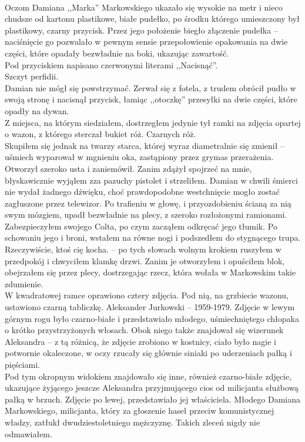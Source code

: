 \documentclass[../MAIN.tex]{subfiles}
\begin{document}
\\
Oczom Damiana ,,Marka'' Markowskiego ukazało się wysokie na metr i nieco chudsze od kartonu plastikowe, białe pudełko, po środku którego umieszczony był plastikowy, czarny przycisk. Przez jego położenie biegło złączenie pudełka -- naciśnięcie go pozwalało w pewnym sensie przepołowienie opakowania na dwie części, które opadały bezwładnie na boki, ukazując zawartość.\\
Pod przyciskiem napisano czerwonymi literami ,,Nacisnąć''.\\
Szczyt perfidii.\\
Damian nie mógł się powstrzymać. Zerwał się z fotela, z trudem obrócił pudło w swoją stronę i nacisnął przycisk, łamiąc ,,otoczkę'' przesyłki na dwie części, które opadły na dywan.\\
Z miejsca, na którym siedziałem, dostrzegłem jedynie tył ramki na zdjęcia opartej o wazon, z którego sterczał bukiet róż. Czarnych róż.\\
Skupiłem się jednak na twarzy starca, której wyraz diametralnie się zmienił -- uśmiech wyparował w mgnieniu oka, zastąpiony przez grymas przerażenia. Otworzył szeroko usta i zaniemówił. Zanim zdążył spojrzeć na mnie, błyskawicznie wyjąłem zza pazuchy pistolet i strzeliłem. Damian w chwili śmierci nie wydał żadnego dźwięku, choć prawdopodobne westchnięcie mogło zostać zagłuszone przez telewizor. Po trafieniu w głowę, i przyozdobieniu ścianą za nią swym mózgiem, upadł bezwładnie na plecy, z szeroko rozłożonymi ramionami.\\
Zabezpieczyłem swojego Colta, po czym zacząłem odkręcać jego tłumik. Po schowaniu jego i broni, wstałem na równe nogi i podszedłem do stygnącego trupa.
\sx Rzeczywiście, ktoś cię kocha. -- po tych słowach wolnym krokiem ruszyłem w przedpokój i chwyciłem klamkę drzwi.
\qd
Zanim je otworzyłem i opuściłem blok, obejrzałem się przez plecy, dostrzegając rzecz, która wołała w Markowskim takie zdumienie.\\
W kwadratowej ramce oprawiono cztery zdjęcia. Pod nią, na grzbiecie wazonu, ustawiono czarną tabliczkę.
\swk[16em]
Aleksander Jurkowski -- 1959-1979.
\qwk
Zdjęcie w lewym górnym rogu było czarno-białe i przedstawiało młodego, uśmiechniętego chłopaka o krótko przystrzyżonych włosach. Obok niego także znajdował się wizerunek Aleksandra -- z tą różnicą, że zdjęcie zrobiono w kostnicy, ciało było nagie i potwornie okaleczone, w oczy rzucały się głównie siniaki po uderzeniach pałką i pięściami.
\\
Pod tym okropnym widokiem znajdowało się inne, również czarno-białe zdjęcie, ukazujące żyjącego jeszcze Aleksandra przyjmującego cios od milicjanta służbową pałką w brzuch. Zdjęcie po lewej, przedstawiało jej właściciela. Młodego Damiana Markowskiego, milicjanta, który za głoszenie haseł przeciw komunistycznej władzy, zatłukł dwudziestoletniego mężczyznę. Takich zleceń nigdy nie odmawiałem.
\end{document}
